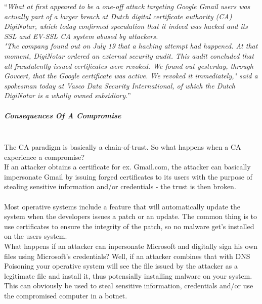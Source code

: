 ``\emph{What at first appeared to be a one-off attack targeting Google Gmail users was actually part of a larger breach at Dutch digital certificate authority (CA) DigiNotar, which today confirmed speculation that it indeed was hacked and its SSL and EV-SSL CA system abused by attackers.\\
"The company found out on July 19 that a hacking attempt had happened. At that moment, DigiNotar ordered an external security audit. This audit concluded that all fraudulently issued certificates were revoked. We found out yesterday, through Govcert, that the Google certificate was active. We revoked it immediately," said a spokesman today at Vasco Data Security International, of which the Dutch DigiNotar is a wholly owned subsidiary.}''

\subparagraph{Consequences Of A Compromise}~\\ %
The CA paradigm is basically a chain-of-trust. So what happens when a CA experience a compromise?\\
If an attacker obtains a certificate for ex. Gmail.com, the attacker can basically impersonate Gmail by issuing forged certificates to its users with the purpose of stealing sensitive information and/or credentials - the trust is then broken.
\\\\
Most operative systems include a feature that will automatically update the system when the developers issues a patch or an update. The common thing is to use certificates to ensure the integrity of the patch, so no malware get's installed on the users system.\\
What happens if an attacker can inpersonate Microsoft and digitally sign his own files using Microsoft's credentials? Well, if an attacker combines that with DNS Poisoning your operative system will see the file issued by the attacker as a legitimate file and install it, thus potensially installing malware on your system.\\
This can obviously be used to steal sensitive information, credentials and/or use the compromised computer in a botnet.